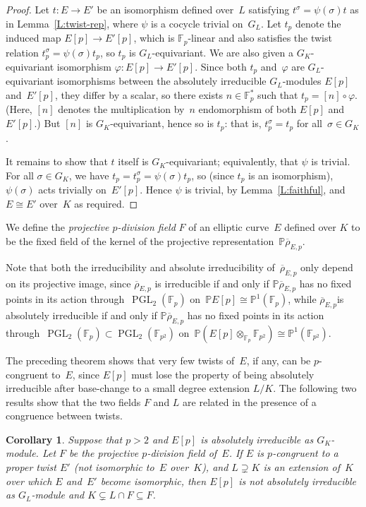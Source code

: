 \documentclass[12pt, reqno]{amsart}
\newcommand{\F}{\mathbb{F}}
\newcommand{\PP}{\mathbb{P}}
\newcommand{\rhobar}{{\overline{\rho}}}
\newcommand{\PGL}{\operatorname{PGL}}
\numberwithin{equation}{section}
\newtheorem{corollary}[theorem]{Corollary}
\theoremstyle{definition}
\theoremstyle{remark}
\begin{document}
\begin{proof}
Let $t :E\to E'$ be an isomorphism defined over~$L$ satisfying
$t ^\sigma=\psi(\sigma)t $ as in Lemma~\ref{L:twist-rep},
where $\psi$ is a cocycle trivial on~$G_L$.  Let $t_p$ denote the
induced map $E[p]\to E'[p]$, which is $\F_p$-linear and also satisfies
the twist relation $t _p^\sigma=\psi(\sigma)t _p$, so
$t _p$ is $G_L$-equivariant.  We are also given a
$G_K$-equivariant isomorphism $\varphi:E[p]\to E'[p]$.  Since both
$t _p$ and~$\varphi$ are $G_L$-equivariant isomorphisms between
the absolutely irreducible $G_L$-modules $E[p]$ and~$E'[p]$, they
differ by a scalar, so there exists $n\in\F_p^*$ such that
$t _p=[n]\circ\varphi$.  (Here, $[n]$ denotes the multiplication
by~$n$ endomorphism of both $E[p]$ and $E'[p]$.)  But $[n]$ is
$G_K$-equivariant, hence so is $t _p$: that is, $t _p^\sigma =
t _p$ for all~$\sigma\in G_K$.

It remains to show that $t $ itself is $G_K$-equivariant;
equivalently, that $\psi$ is trivial.  For all $\sigma\in G_K$, we
have $t _p = t _p^\sigma = \psi(\sigma)t _p$, so (since $t _p$ is an
isomorphism), $\psi(\sigma)$ acts trivially on~$E'[p]$.  Hence $\psi$
is trivial, by Lemma~\ref{L:faithful}, and $E\cong E'$ over~$K$ as
required.
\end{proof}

We define the \emph{projective $p$-division field} $F$ of an elliptic
curve~$E$ defined over $K$ to be the fixed field of the kernel of the
projective representation~$\PP \rhobar_{E,p}$. 


Note that both the
irreducibility and absolute irreducibility of~$\rhobar_{E,p}$ only
depend on its projective image, since $\rhobar_{E,p}$ is irreducible if
and only if $\PP \rhobar_{E,p}$ has no fixed points in its action
through~$\PGL_2(\F_p)$ on~$\PP E[p]\cong\PP^1(\F_p)$, while
$\rhobar_{E,p}$is absolutely irreducible if and only if $\PP
\rhobar_{E,p}$ has no fixed points in its action
through~$\PGL_2(\F_p)\subset\PGL_2(\F_{p^2})$ on~$\PP
(E[p]\otimes_{\F_p}\F_{p^2})\cong\PP^1(\F_{p^2})$.

The preceding theorem shows that very few twists of~$E$, if any, can be
$p$-congruent to~$E$, since $E[p]$ must lose the property of being
absolutely irreducible after base-change to a small degree extension
$L/K$. The following two results show that the two fields $F$ and $L$ are related in the presence of a congruence between twists.

\begin{corollary}\label{C:constraint}
Suppose that $p>2$ and $E[p]$ is absolutely irreducible as
$G_K$-module.  Let $F$ be the projective $p$-division field of~$E$.
If $E$ is $p$-congruent to a proper twist $E'$ (not isomorphic to~$E$
over~$K$), and $L\supsetneq K$ is an extension of~$K$ over which $E$
and~$E'$ become isomorphic, then $E[p]$ is not absolutely irreducible
as $G_L$-module and $K\subsetneq L\cap F\subseteq F$.
\end{corollary}
\end{document}
